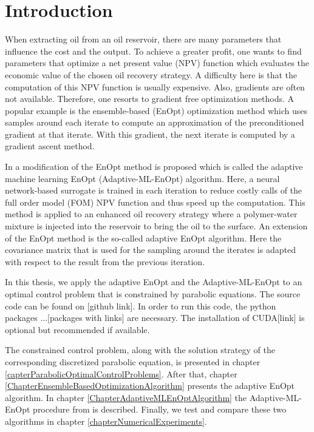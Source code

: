 \chapter{Introduction}

When extracting oil from an oil reservoir, there are many parameters that influence the cost and the output. To achieve a greater profit, one wants to find parameters that optimize a net present value (NPV) function which evaluates the economic value of the chosen oil recovery strategy. A difficulty here is that the computation of this NPV function is usually expensive. Also, gradients are often not available. Therefore, one resorts to gradient free optimization methods. A popular example is the ensemble-based (EnOpt) optimization method which uses samples around each iterate to compute an approximation of the preconditioned gradient at that iterate. With this gradient, the next iterate is computed by a gradient ascent method.

In \cite{Keil2022-dj} a modification of the EnOpt method is proposed which is called the adaptive machine learning EnOpt (Adaptive-ML-EnOpt) algorithm. Here, a neural network-based surrogate is trained in each iteration to reduce costly calls of the full order model (FOM) NPV function and thus speed up the computation. This method is applied to an enhanced oil recovery strategy where a polymer-water mixture is injected into the reservoir to bring the oil to the surface. An extension of the EnOpt method is the so-called adaptive EnOpt algorithm. Here the covariance matrix that is used for the sampling around the iterates is adapted with respect to the result from the previous iteration.

In this thesis, we apply the adaptive EnOpt and the Adaptive-ML-EnOpt to an optimal control problem that is constrained by parabolic equations. The source code can be found on [github link]. In order to run this code, the python packages ...[packages with links] are necessary. The installation of CUDA[link] is optional but recommended if available.

The constrained control problem, along with the solution strategy of the corresponding discretized parabolic equation, is presented in chapter \ref{capterParabolicOptimalControlProblems}. After that, chapter \ref{ChapterEnsembleBasedOptimizationAlgorithm} presents the adaptive EnOpt algorithm. In chapter \ref{ChapterAdaptiveMLEnOptAlgorithm} the Adaptive-ML-EnOpt procedure from \cite{Keil2022-dj} is described. Finally, we test and compare these two algorithms in chapter \ref{chapterNumericalExperiments}.